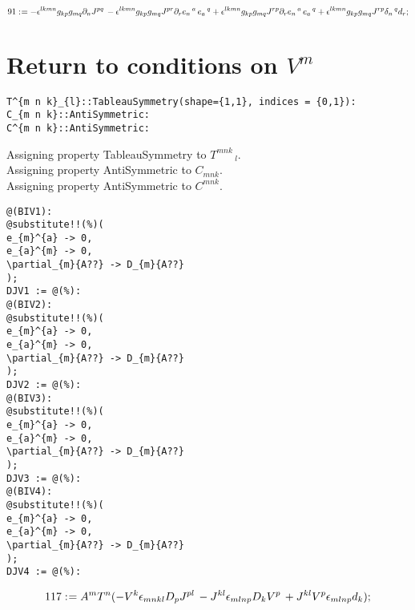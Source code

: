 \documentclass[11pt]{article}
\def\specialcolon{\mathrel{\mathop{:}}\hspace{-.5em}}
\begin{document}
\begin{dmath*}[compact, spread=2pt]
91\specialcolon{}=  - {\epsilon}^{l k m n} {g}_{k p} {g}_{m q} {\partial}_{n}{{J}^{p q}}\,  - {\epsilon}^{l k m n} {g}_{k p} {g}_{m q} {J}^{p r} {\partial}_{r}{{e}_{n}\,^{a}}\,  {e}_{a}\,^{q} + {\epsilon}^{l k m n} {g}_{k p} {g}_{m q} {J}^{r p} {\partial}_{r}{{e}_{n}\,^{a}}\,  {e}_{a}\,^{q} + {\epsilon}^{l k m n} {g}_{k p} {g}_{m q} {J}^{r p} {\delta}_{n}\,^{q} {d}_{r};
\end{dmath*}
\section*{Return to conditions on $V^{m}$}
{\color[named]{Blue}\begin{verbatim}
T^{m n k}_{l}::TableauSymmetry(shape={1,1}, indices = {0,1}):
C_{m n k}::AntiSymmetric:
C^{m n k}::AntiSymmetric:
\end{verbatim}}
Assigning property TableauSymmetry to ${T}^{m n k}\,_{l}$.
\\
Assigning property AntiSymmetric to ${C}_{m n k}$.
\\
Assigning property AntiSymmetric to ${C}^{m n k}$.
\\
{\color[named]{Blue}\begin{verbatim}
@(BIV1):
@substitute!!(%)(
e_{m}^{a} -> 0,
e_{a}^{m} -> 0,
\partial_{m}{A??} -> D_{m}{A??}
);
DJV1 := @(%):
@(BIV2):
@substitute!!(%)(
e_{m}^{a} -> 0,
e_{a}^{m} -> 0,
\partial_{m}{A??} -> D_{m}{A??}
);
DJV2 := @(%):
@(BIV3):
@substitute!!(%)(
e_{m}^{a} -> 0,
e_{a}^{m} -> 0,
\partial_{m}{A??} -> D_{m}{A??}
);
DJV3 := @(%):
@(BIV4):
@substitute!!(%)(
e_{m}^{a} -> 0,
e_{a}^{m} -> 0,
\partial_{m}{A??} -> D_{m}{A??}
);
DJV4 := @(%):
\end{verbatim}}


\begin{dmath*}[compact, spread=2pt]
117\specialcolon{}= {A}^{m} {T}^{n} ( - {V}^{k} {\epsilon}_{m n k l} {D}_{p}{{J}^{p l}}\,  - {J}^{k l} {\epsilon}_{m l n p} {D}_{k}{{V}^{p}}\,  + {J}^{k l} {V}^{p} {\epsilon}_{m l n p} {d}_{k});
\end{dmath*}
\end{document}
